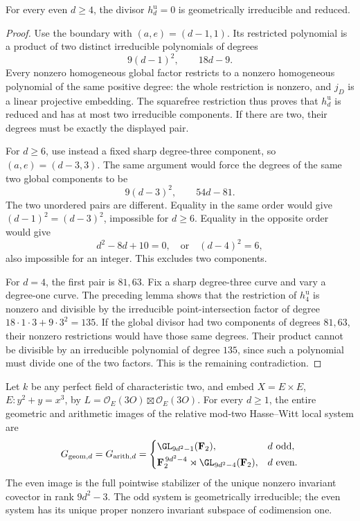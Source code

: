 \begin{theorem}
\label{thm:ss-even-unit-Hasse-irreducible}
For every even $d\ge4$, the divisor $h_d^{\mathrm u}=0$ is
geometrically irreducible and reduced.
\end{theorem}

\begin{proof}
Use the boundary with $(a,e)=(d-1,1)$. Its restricted
polynomial is a product of two distinct irreducible polynomials
of degrees
\[
                        9(d-1)^2,\qquad18d-9.
\]
Every nonzero homogeneous global factor restricts to a nonzero
homogeneous polynomial of the same positive degree: the whole
restriction is nonzero, and $j_D$ is a linear projective
embedding. The squarefree restriction thus proves that
$h_d^{\mathrm u}$ is reduced and has at most two irreducible
components. If there are two, their degrees must be exactly
the displayed pair.

For $d\ge6$, use instead a fixed sharp degree-three component,
so $(a,e)=(d-3,3)$. The same argument would force the degrees
of the same two global components to be
\[
                       9(d-3)^2,\qquad54d-81.
\]
The two unordered pairs are different. Equality in the same
order would give $(d-1)^2=(d-3)^2$, impossible for $d\ge6$.
Equality in the opposite order would give
\[
                  d^2-8d+10=0,
                  \quad\text{or}\quad(d-4)^2=6,
\]
also impossible for an integer. This excludes two components.

For $d=4$, the first pair is $81,63$.
Fix a sharp degree-three curve and vary a degree-one curve.
The preceding lemma shows that the restriction of $h_4^{\mathrm u}$
is nonzero and divisible by the irreducible point-intersection
factor of degree $18\cdot1\cdot3+9\cdot3^2=135$.
If the global divisor had two components of degrees $81,63$,
their nonzero restrictions would have those same degrees.
Their product cannot be divisible by an irreducible polynomial
of degree $135$, since such a polynomial must divide one of
the two factors. This is the remaining contradiction.
\end{proof}

\begin{theorem}
\label{thm:ss-product-all-full-groups}
Let $k$ be any perfect field of characteristic two, and embed
$X=E\times E$, $E:y^2+y=x^3$, by
$L=\mathcal O_E(3O)\boxtimes\mathcal O_E(3O)$.
For every $d\ge1$, the entire geometric and arithmetic images
of the relative mod-two Hasse--Witt local system are
\[
 G_{\mathrm{geom},d}=G_{\mathrm{arith},d}=
 \begin{cases}
 \GL_{9d^2-1}(\mathbf F_2),&d\text{ odd},\\[2pt]
 \mathbf F_2^{\,9d^2-4}\rtimes\GL_{9d^2-4}(\mathbf F_2),
                                      &d\text{ even}.
 \end{cases}
\]
The even image is the full pointwise stabilizer of the unique
nonzero invariant covector in rank $9d^2-3$. The odd system
is geometrically irreducible; the even system has its unique
proper nonzero invariant subspace of codimension one.
\end{theorem}

